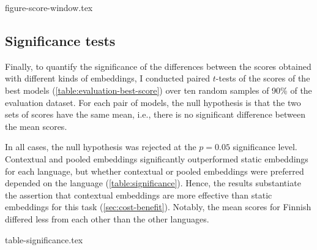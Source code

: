 {figure-score-window.tex}

\subsection{Significance tests}
\label{sec:significance}

Finally, to quantify the significance of the differences between the scores obtained
with different kinds of embeddings, I conducted paired $t$-tests of the scores of the
best models (\cref{table:evaluation-best-score}) over ten random samples of 90\% of the
evaluation dataset.
For each pair of models, the null hypothesis is that the two sets of scores have the
same mean, i.e., there is no significant difference between the mean scores.

In all cases, the null hypothesis was rejected at the $p = 0.05$ significance level.
Contextual and pooled embeddings significantly outperformed static embeddings for each
language, but whether contextual or pooled embeddings were preferred depended on the
language (\cref{table:significance}).
Hence, the results substantiate the assertion that contextual embeddings are more
effective than static embeddings for this task (\cref{sec:cost-benefit}).
Notably, the mean scores for Finnish differed less from each other than the other
languages.

{table-significance.tex}